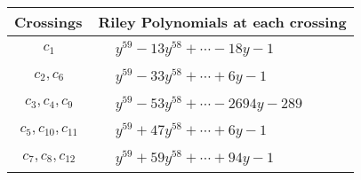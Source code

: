 \documentclass[1p]{elsarticle_modified}
\theoremstyle{definition}
\begin{document}
\begin{tabular}{m{50pt}|m{274pt}}
Crossings & \hspace{64pt}Riley Polynomials at each crossing \\
\hline $$\begin{aligned}c_{1}\end{aligned}$$&$\begin{aligned}
&y^{59}-13 y^{58}+\cdots-18 y-1
\end{aligned}$\\
\hline $$\begin{aligned}c_{2},c_{6}\end{aligned}$$&$\begin{aligned}
&y^{59}-33 y^{58}+\cdots+6 y-1
\end{aligned}$\\
\hline $$\begin{aligned}c_{3},c_{4},c_{9}\end{aligned}$$&$\begin{aligned}
&y^{59}-53 y^{58}+\cdots-2694 y-289
\end{aligned}$\\
\hline $$\begin{aligned}c_{5},c_{10},c_{11}\end{aligned}$$&$\begin{aligned}
&y^{59}+47 y^{58}+\cdots+6 y-1
\end{aligned}$\\
\hline $$\begin{aligned}c_{7},c_{8},c_{12}\end{aligned}$$&$\begin{aligned}
&y^{59}+59 y^{58}+\cdots+94 y-1
\end{aligned}$\\
\hline
\end{tabular}
\vskip 2pc
\end{document}
